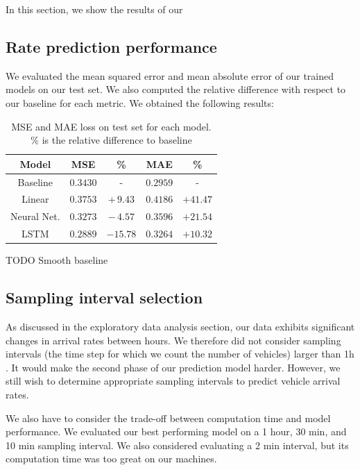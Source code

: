 \documentclass[10pt,conference,compsocconf]{IEEEtran}
\begin{document}
In this section, we show the results of our  

\subsection{Rate prediction performance}

We evaluated the mean squared error and mean absolute error of our trained models on our test set. We 
also computed the relative difference with respect to our baseline for each metric.
We obtained the following results:

\begin{table}[h!]
\begin{center}
    \begin{tabular}[c]{| c| c c | c c | }
        \hline
         \textbf{Model} & \textbf{MSE} & \% & \textbf{MAE} & \%\\
         \hline
         Baseline    & $0.3430$ &   -       & $0.2959$ & -\\
         Linear      & $0.3753$ & $+\,9.43$ & $0.4186$ & $+41.47$ \\
         Neural Net. & $0.3273$ & $-\,4.57$ & $0.3596$ & $+21.54$ \\
         LSTM        & $0.2889$ & $-15.78$  & $0.3264$ & $+10.32$  \\
         \hline
    \end{tabular}
\end{center}
\label{table:ratepred}
\caption{MSE and MAE loss on test set for each model.\\
{\footnotesize \% is the relative difference to baseline}}
\end{table}

TODO Smooth baseline

\subsection{Sampling interval selection}

As discussed in the exploratory data analysis section, our data exhibits significant changes in arrival
rates between hours.  We therefore did not consider sampling intervals (the time step for which we count the number of vehicles) larger than 1h . It would make the second phase of our prediction model harder. However, we still 
wish to determine appropriate sampling intervals to predict vehicle arrival rates. 

We also have to consider the trade-off between computation time and model performance. We evaluated our
best performing model on a 1 hour, 30 min, and 10 min sampling interval. We also considered evaluating a
2 min interval, but its computation time was too great on our machines.
\end{document}
